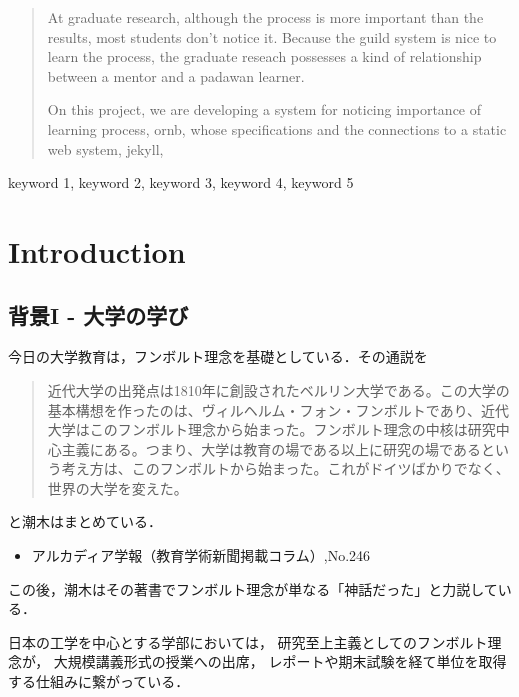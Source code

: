 \documentclass{hissymp}
\date{}
\title{}
\begin{document}
\begin{abstract}
\label{sec:org718d83b}
At graduate research, 
although the process is more important than the results,
most students don't notice it.
Because the guild system is nice to learn the process,
the graduate reseach possesses a kind of
relationship between 
a mentor and a padawan learner.

On this project, 
we are developing a system for
noticing importance of learning process,
ornb, whose specifications and 
the connections to a static web system, jekyll,

\end{abstract}

\begin{keyword}
keyword 1, keyword 2, keyword 3, keyword 4, keyword 5
\end{keyword}

\maketitle
\section{Introduction}

\label{sec:org8ddc7c6}
\subsection{背景I - 大学の学び}
\label{sec:org95f2f75}
今日の大学教育は，フンボルト理念を基礎としている．その通説を
\begin{quote}
近代大学の出発点は1810年に創設されたベルリン大学である。この大学の基本構想を作ったのは、ヴィルヘルム・フォン・フンボルトであり、近代大学はこのフンボルト理念から始まった。フンボルト理念の中核は研究中心主義にある。つまり、大学は教育の場である以上に研究の場であるという考え方は、このフンボルトから始まった。これがドイツばかりでなく、世界の大学を変えた。
\end{quote}
と潮木はまとめている．
\begin{itemize}
\item アルカディア学報（教育学術新聞掲載コラム）,No.246
\end{itemize}
この後，潮木はその著書でフンボルト理念が単なる「神話だった」と力説している．

日本の工学を中心とする学部においては，
研究至上主義としてのフンボルト理念が，
大規模講義形式の授業への出席，
レポートや期末試験を経て単位を取得する仕組みに繋がっている．
\end{document}
